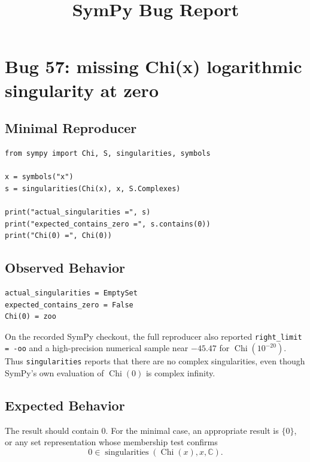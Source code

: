 \documentclass[11pt]{article}
\title{SymPy Bug Report}
\author{}
\date{}
\begin{document}
\maketitle

\section{Bug 57: missing Chi(x) logarithmic singularity at zero}

\subsection{Minimal Reproducer}

\medskip

\begin{lstlisting}[style=bugpython]
from sympy import Chi, S, singularities, symbols

x = symbols("x")
s = singularities(Chi(x), x, S.Complexes)

print("actual_singularities =", s)
print("expected_contains_zero =", s.contains(0))
print("Chi(0) =", Chi(0))
\end{lstlisting}

\subsection{Observed Behavior}

\medskip

\begin{lstlisting}[style=bugpython]
actual_singularities = EmptySet
expected_contains_zero = False
Chi(0) = zoo
\end{lstlisting}

On the recorded SymPy checkout, the full reproducer also reported
\texttt{right\_limit = -oo} and a high-precision numerical sample near
\(-45.47\) for \(\operatorname{Chi}(10^{-20})\). Thus \texttt{singularities}
reports that there are no complex singularities, even though SymPy's own
evaluation of \(\operatorname{Chi}(0)\) is complex infinity.

\subsection{Expected Behavior}

The result should contain \(0\). For the minimal case, an appropriate result is
\(\{0\}\), or any set representation whose membership test confirms
\[
0 \in \operatorname{singularities}(\operatorname{Chi}(x), x, \mathbb{C}).
\]
\end{document}
